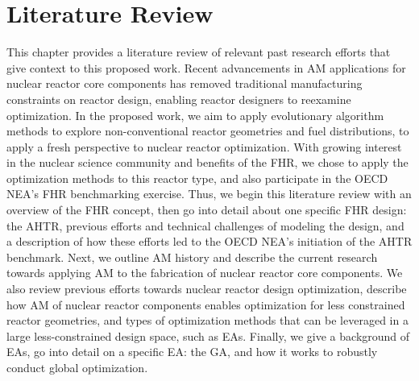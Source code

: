 \chapter{Literature Review}

This chapter provides a literature review of relevant past research efforts 
that give context to this proposed work.
Recent advancements in \gls{AM} applications for nuclear reactor core 
components has removed traditional manufacturing constraints on reactor design, 
enabling reactor designers to reexamine optimization.
In the proposed work, we aim to apply evolutionary algorithm methods to explore 
non-conventional reactor geometries and fuel distributions, to apply a fresh 
perspective to nuclear reactor optimization. 
With growing interest in the nuclear science community and benefits of the 
\gls{FHR}, we chose to apply the optimization methods to this reactor type, 
and also participate in the \gls{OECD} \gls{NEA}'s \gls{FHR} benchmarking exercise. 
Thus, we begin this literature review with an overview of the \gls{FHR} concept, 
then go into detail about one specific \gls{FHR} design: the \gls{AHTR}, 
previous efforts and technical challenges of modeling the design, and a 
description of how these efforts led to the \gls{OECD} \gls{NEA}'s initiation of 
the \gls{AHTR} benchmark.
Next, we outline \gls{AM} history and describe the current research towards applying 
\gls{AM} to the fabrication of nuclear reactor core components. 
We also review previous efforts towards nuclear reactor design optimization, 
describe how \gls{AM} of nuclear reactor components enables optimization for 
less constrained reactor geometries, and types of optimization methods that can be 
leveraged in a large less-constrained design space, such as \glspl{EA}.  
Finally, we give a background of \glspl{EA}, go into detail on a 
specific \gls{EA}: the \gls{GA}, and how it works to robustly conduct global 
optimization. 

